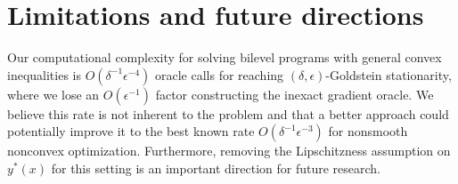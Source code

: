\section{Limitations and future directions}
Our computational complexity for solving bilevel programs with general convex inequalities is $O(\delta^{-1} \epsilon^{-4})$ oracle calls for reaching $(\delta,\epsilon)$-Goldstein stationarity, where we lose an $O(\epsilon^{-1})$ factor constructing the inexact gradient oracle. We believe this rate is not inherent to the problem and that a better approach could potentially improve it to the best known rate $O(\delta^{-1} \epsilon^{-3})$ for nonsmooth nonconvex optimization. Furthermore, removing the Lipschitzness assumption on $y^*(x)$ for this setting is an important direction for future research.
